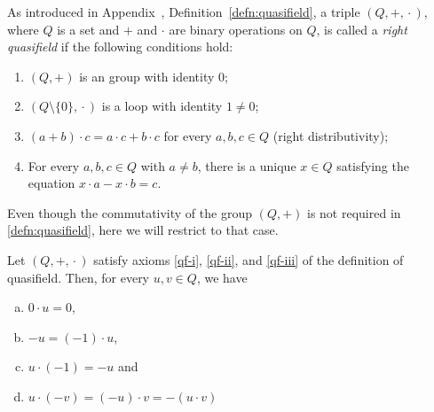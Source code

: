 \begin{defn}
    As introduced in Appendix~, Definition~\ref{defn:quasifield}, a triple\/ $(Q, +,{}\cdot{})$, where\/ $Q$ is a set and\/ $+$ and\/ $\cdot$ are binary operations on\/ $Q$, is called a \textsl{right quasifield} if the following conditions hold:
    \begin{enumerate}[\roman*.,
        ref=\upshape(\scshape\roman*),
        font=\upshape\scshape]
        \item\label{qf-i} $(Q, +)$ is an group with identity\/ $0$;
        \item\label{qf-ii} $(Q \setminus \{0\}, {}\cdot{})$ is a loop with identity\/ $1\ne0$;
        \item\label{qf-iii} $(a+b) \cdot c = a \cdot c + b \cdot c$ for every\/ $a,b,c \in Q$ (right distributivity);
        \item\label{qf-iv} For every\/ $a, b, c \in Q$ with\/ $a \ne b$, there is a unique\/ $x \in Q$ satisfying the equation\/ $x \cdot a - x \cdot b = c$.
    \end{enumerate}
\end{defn}

\begin{rem}
    Even though the commutativity of the group $(Q,+)$ is not required in \ref{defn:quasifield}, here we will restrict to that case.
\end{rem}

\begin{prop}\label{prop:trivial-properties}
    Let\/ $(Q, +, {}\cdot{})$ satisfy axioms\/ \ref{qf-i}, \ref{qf-ii}, and\/ \ref{qf-iii} of the definition of quasifield. Then, for every\/ $u, v \in Q$, we have
    \begin{enumerate}[a),font=\upshape]
        \item $0\cdot u=0$,
        \item $-u = (-1) \cdot u$,
        \item $u\cdot(-1)=-u$ and
        \item $u \cdot (-v) = (-u) \cdot v = -(u \cdot v)$
    \end{enumerate}
\end{prop}


